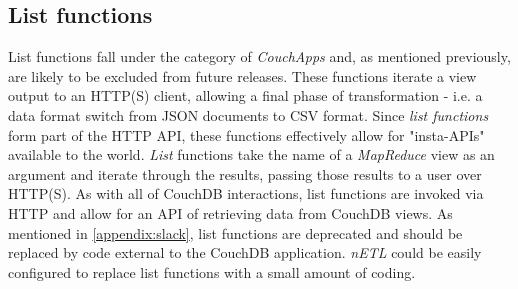 \subsection{List functions}
List functions fall under the category of \textit{CouchApps} and, as mentioned previously, are likely to be excluded from future releases. These functions iterate a view output to an HTTP(S) client, allowing a final phase of transformation - i.e. a data format switch from JSON documents to CSV format. Since \textit{list functions} form part of the HTTP API, these functions effectively allow for "insta-APIs" available to the world. \textit{List} functions take the name of a \textit{MapReduce} view as an argument and iterate through the results, passing those results to a user over HTTP(S). As with all of CouchDB interactions, list functions are invoked via HTTP and allow for an API of retrieving data from CouchDB views. As mentioned in \ref{appendix:slack}, list functions are deprecated and should be replaced by code external to the CouchDB application. \textit{nETL} could be easily configured to replace list functions with a small amount of coding.